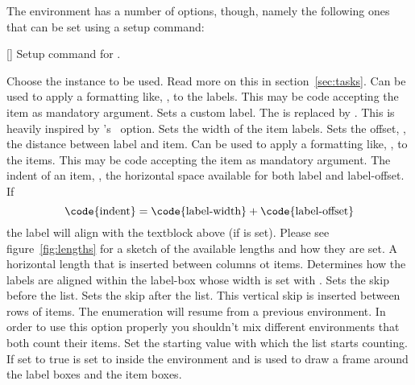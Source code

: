 \documentclass[load-preamble+]{cnltx-doc}
\begin{document}
The environment  has a number of options, though, namely the
following ones that can be set using a setup command:
\begin{commands}
  []
    Setup command for \Tasks.
\end{commands}
\begin{options}
  \Default
     Choose the instance to be used.  Read more on this in
     section~\ref{sec:tasks}.
  \Default
    Can be used to apply a formatting like, \eg,
     to the labels.  This may be code accepting the item as
    mandatory argument.
    Sets a custom label.  The \code{*} is replaced by
    .  This is heavily inspired by
    's~\cite{pkg:enumitem}  option.
  \Default{1em}
    Sets the width of the item labels.
  \Default{.3333em}
    Sets the offset, \ie, the distance between label and
    item.
  \Default
    Can be used to apply a formatting like, \eg,
     to the items. This may be code accepting the item as
    mandatory argument.
  \Default{2.5em}
    The indent of an item, \ie, the horizontal space
    available for both label and label-offset.  If
    \[
      \text{\code{indent}} =
      \text{\code{label-width}} + \text{\code{label-offset}}
    \]
    the label will align with the textblock above (if
     is set).  Please see figure~\ref{fig:lengths}
    for a sketch of the available lengths and how they are set.
  \Default{0pt}
    A horizontal length that is inserted between columns ot
    items.
    Determines how the labels are aligned within the
    label-box whose width is set with .
  \Default{0pt}
    Sets the skip before the list.
  \Default{0pt}
    Sets the skip after the list.
    This vertical skip is inserted between rows of items.
    The enumeration will resume from a previous  environment.  In
    order to use this option properly you shouldn't mix different 
    environments that both count their items.
    Set the starting value with which the list starts
    counting.
    If set to true  is set to \code{0pt}
    inside the  environment and  is used to draw a frame
    around the label boxes and the item boxes.
\end{options}
\end{document}
